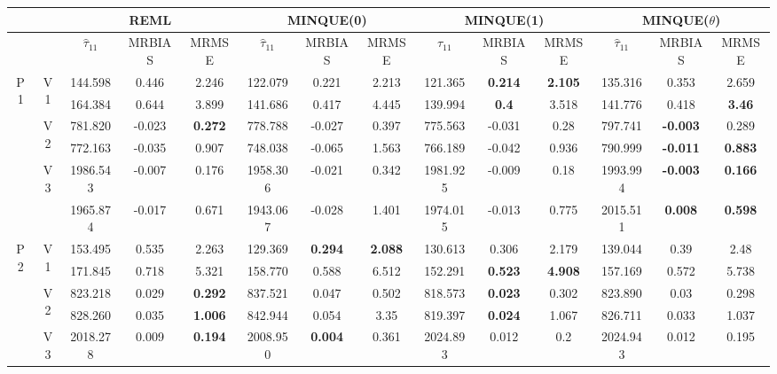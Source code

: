 \documentclass[12pt,a4paper]{article}
\begin{document}
\begin{sidewaystable}[ht]
\centering
{\footnotesize
\begin{tabular}{cc|ccc|ccc|ccc|ccc|}
   & & \multicolumn{3}{c|}{REML}&\multicolumn{3}{c|}{MINQUE(0)}&\multicolumn{3}{c|}{MINQUE(1)}&\multicolumn{3}{c|}{MINQUE($\theta$)}\\ \hline
 &  & $\hat{\tau}_{11}$ & MRBIAS & MRMSE & $\hat{\tau}_{11}$ & MRBIAS & MRMSE & $\hat{\tau}_{11}$ & MRBIAS & MRMSE & $\hat{\tau}_{11}$ & MRBIAS & MRMSE \\ 
  \hline
\multirow{6}{*}{P1} & \multirow{2}{*}{V1} & 144.598 & 0.446 & 2.246 & 122.079 & 0.221 & 2.213 & 121.365 & \textbf{0.214} & \textbf{2.105} & 135.316 & 0.353 & 2.659 \\ 
   &  & 164.384 & 0.644 & 3.899 & 141.686 & 0.417 & 4.445 & 139.994 & \textbf{0.4} & 3.518 & 141.776 & 0.418 & \textbf{3.46} \\ 
   & \multirow{2}{*}{V2} & 781.820 & -0.023 & \textbf{0.272} & 778.788 & -0.027 & 0.397 & 775.563 & -0.031 & 0.28 & 797.741 & \textbf{-0.003} & 0.289 \\ 
   &  & 772.163 & -0.035 & 0.907 & 748.038 & -0.065 & 1.563 & 766.189 & -0.042 & 0.936 & 790.999 & \textbf{-0.011} & \textbf{0.883} \\ 
   & \multirow{2}{*}{V3} & 1986.543 & -0.007 & 0.176 & 1958.306 & -0.021 & 0.342 & 1981.925 & -0.009 & 0.18 & 1993.994 & \textbf{-0.003} & \textbf{0.166} \\ 
   &  & 1965.874 & -0.017 & 0.671 & 1943.067 & -0.028 & 1.401 & 1974.015 & -0.013 & 0.775 & 2015.511 & \textbf{0.008} & \textbf{0.598} \\ 
   \hline \hline\multirow{6}{*}{P2} & \multirow{2}{*}{V1} & 153.495 & 0.535 & 2.263 & 129.369 & \textbf{0.294} & \textbf{2.088} & 130.613 & 0.306 & 2.179 & 139.044 & 0.39 & 2.48 \\ 
   &  & 171.845 & 0.718 & 5.321 & 158.770 & 0.588 & 6.512 & 152.291 & \textbf{0.523} & \textbf{4.908} & 157.169 & 0.572 & 5.738 \\ 
   & \multirow{2}{*}{V2} & 823.218 & 0.029 & \textbf{0.292} & 837.521 & 0.047 & 0.502 & 818.573 & \textbf{0.023} & 0.302 & 823.890 & 0.03 & 0.298 \\ 
   &  & 828.260 & 0.035 & \textbf{1.006} & 842.944 & 0.054 & 3.35 & 819.397 & \textbf{0.024} & 1.067 & 826.711 & 0.033 & 1.037 \\ 
   & \multirow{2}{*}{V3} & 2018.278 & 0.009 & \textbf{0.194} & 2008.950 & \textbf{0.004} & 0.361 & 2024.893 & 0.012 & 0.2 & 2024.943 & 0.012 & 0.195 \\ 

\end{tabular}}
\end{sidewaystable}
\end{document}
